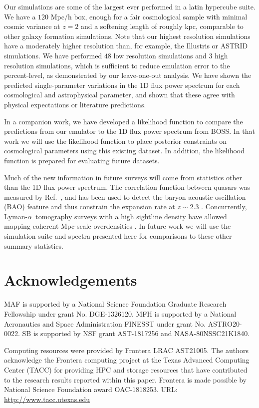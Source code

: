 \documentclass[a4paper,11pt]{article}
\newcommand{\Lya}{Lyman-$\alpha$}
\begin{document}
Our simulations are some of the largest ever performed in a latin hypercube suite. We have a $120$ Mpc/h box, enough for a fair cosmological sample with minimal cosmic variance at $z=2$ and a softening length of roughly kpc, comparable to other galaxy formation simulations. Note that our highest resolution simulations have a moderately higher resolution than, for example, the Illustris \cite{Vogelsberger:2014} or ASTRID \cite{Bird:2022, Ni:2021} simulations. We have performed $48$ low resolution simulations and $3$ high resolution simulations, which is sufficient to reduce emulation error to the percent-level, as demonstrated by our leave-one-out analysis. We have shown the predicted single-parameter variations in the 1D flux power spectrum for each cosmological and astrophysical parameter, and shown that these agree with physical expectations or literature predictions.

In a companion work, we have developed a likelihood function to compare the predictions from our emulator to the 1D flux power spectrum from BOSS. In that work we will use the likelihood function to place posterior constraints on cosmological parameters using this existing dataset. In addition, the likelihood function is prepared for evaluating future datasets.

Much of the new information in future surveys will come from statistics other than the 1D flux power spectrum. The correlation function between quasars was measured by Ref.~\cite{Slosar:2011}, and has been used to detect the baryon acoustic oscillation (BAO) feature and thus constrain the expansion rate at $z\sim 2.3$ \cite{dSAgathe:2019, Cuceu:2022}. Concurrently, \Lya~tomography surveys with a high sightline density have allowed mapping coherent Mpc-scale overdensities \cite{Lee:CLAMATO, LATIS, Qezlou:2022}. In future work we will use the simulation suite and spectra presented here for comparisons to these other summary statistics.

\section*{Acknowledgements}
MAF is supported by a National Science Foundation Graduate Research Fellowship under grant No. DGE-1326120.
MFH is supported by a National Aeronautics and Space Administration FINESST under grant No. ASTRO20-0022.
SB is supported by NSF grant AST-1817256 and NASA-80NSSC21K1840.

Computing resources were provided by Frontera LRAC AST21005.
The authors acknowledge the Frontera computing project at the Texas Advanced Computing Center (TACC) for providing HPC and storage resources that have contributed to the research results reported within this paper.
Frontera is made possible by National Science Foundation award OAC-1818253.
URL: \url{http://www.tacc.utexas.edu}
\end{document}
